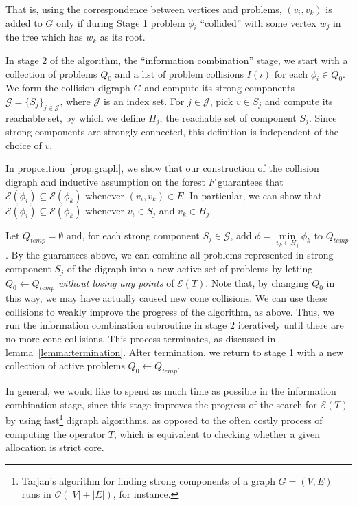 \documentclass[11pt,reqno]{amsart}
\theoremstyle{definition}
\numberwithin{equation}{section}
\newcommand{\pre}{\phi}
\newcommand{\sub}{\subseteq}
\newcommand{\fix}{\mathcal{E}}
\newcommand{\strongc}{\mathcal{G}}
\newcommand{\strongcomp}{S}
\newcommand{\acto}{Q_0}
\newcommand{\actt}{Q_{temp}}
\newcommand{\coll}{I}
\newcommand{\reach}{H}
\newcommand{\forest}{F}
\begin{document}
That is, using the correspondence between vertices and problems, $(v_i,v_k)$ is added to $G$ only if during Stage 1 problem $\pre_i$ ``collided'' with some vertex $w_j$ in the tree which has $w_k$ as its root.  

In stage 2 of the algorithm, the ``information combination'' stage, we start with a collection of problems $\acto$ and a list of problem collisions $\coll(i)$ for each $\pre_i \in \acto$.
We form the collision digraph $G$ and compute its strong components $\strongc = \{\strongcomp_j\}_{j\in \mathcal{J}}$, where $\mathcal{J}$ is an index set. 
For $j \in \mathcal{J}$, pick $v \in \strongcomp_j$ and compute its reachable set, by which we define $\reach_j$, the reachable set of component $\strongcomp_j$. 
Since strong components are strongly connected, this definition is independent of the choice of $v$. 

In proposition~\ref{prop:graph}, we show that our construction of the collision digraph and inductive assumption on the forest $\forest$ guarantees that $\fix(\pre_i) \sub \fix(\pre_k)$ whenever $(v_i,v_k) \in E$.
In particular, we can show that $\fix(\pre_i) \sub \fix(\pre_k)$ whenever $v_i \in \strongcomp_j$ and $v_k \in \reach_j$.

Let $\actt = \emptyset$ and, for each strong component $\strongcomp_j \in \strongc$, add $\pre = \min\limits_{v_k \in \reach_j} \pre_k$ to $\actt$.
By the guarantees above, we can combine all problems represented in strong component $\strongcomp_j$ of the digraph into a new active set of problems by letting $\acto \leftarrow \actt$ \emph{without losing any points} of $\fix(T)$.
Note that, by changing $\acto$ in this way, we may have actually caused new cone collisions.
We can use these collisions to weakly improve the progress of the algorithm, as above.
Thus, we run the information combination subroutine in stage 2 iteratively until there are no more cone collisions.
This process terminates, as discussed in lemma~\ref{lemma:termination}.
After termination, we return to stage 1 with a new collection of active problems $\acto \leftarrow \actt$.

In general, we would like to spend as much time as possible in the information combination stage, since this stage improves the progress of the search for $\fix(T)$ by using fast\footnote{Tarjan's algorithm for finding strong components of a graph $G = (V,E)$ runs in $\mathcal{O}(|V| + |E|)$, for instance.} digraph algorithms, as opposed to the often costly process of computing the operator $T$, which is equivalent to checking whether a given allocation is strict core.  
\end{document}
